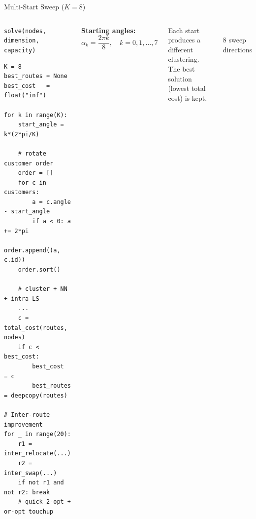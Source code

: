 \documentclass{beamer}
\begin{document}
\begin{frame}[fragile,shrink=10]{Multi-Start Sweep ($K=8$)}

\begin{columns}[T]

\begin{block}{\texttt{solve(nodes, dimension, capacity)}}
\begin{lstlisting}
K = 8
best_routes = None
best_cost   = float("inf")

for k in range(K):
    start_angle = k*(2*pi/K)

    # rotate customer order
    order = []
    for c in customers:
        a = c.angle - start_angle
        if a < 0: a += 2*pi
        order.append((a, c.id))
    order.sort()

    # cluster + NN + intra-LS
    ...
    c = total_cost(routes, nodes)
    if c < best_cost:
        best_cost   = c
        best_routes = deepcopy(routes)

# Inter-route improvement
for _ in range(20):
    r1 = inter_relocate(...)
    r2 = inter_swap(...)
    if not r1 and not r2: break
    # quick 2-opt + or-opt touchup
\end{lstlisting}
\end{block}

\small
\textbf{Starting angles:}
\[
  \alpha_k = \frac{2\pi k}{8}, \quad k = 0,1,\ldots,7
\]

Each start produces a different clustering. The best solution (lowest total cost) is kept.

\vspace{0.4em}
\begin{center}
\\
\footnotesize 8 sweep directions
\end{center}
\end{columns}

\end{frame}
\end{document}
